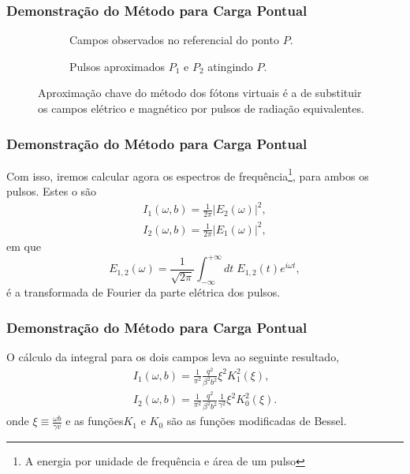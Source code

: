 \documentclass[xcolor=dvipsnames]{beamer}
\begin{document}
\begin{frame}
	\frametitle{Demonstração do Método para Carga Pontual}
	\begin{figure}
		\begin{subfigure}[b]{0.4\textwidth}
			\centering
			
			\caption{Campos observados no referencial do ponto $P$.}
		\end{subfigure}
		\hspace{1cm}
		\begin{subfigure}[b]{0.4\textwidth}
			\centering
			
			\caption{Pulsos aproximados $P_1$ e $P_2$ atingindo $P$.}
		\end{subfigure}
		\caption{Aproximação chave do método dos fótons virtuais é a de
		substituir os campos elétrico e magnético por pulsos de radiação
		equivalentes.}
	\end{figure}
\end{frame}

\begin{frame}
	\frametitle{Demonstração do Método para Carga Pontual}
	Com isso, iremos calcular agora os espectros de frequência\footnote{A
	energia por unidade de frequência e área de um pulso}, para ambos os
	pulsos. Estes o são
	\begin{gather}
		I_1(\omega , b) = \frac{1}{2\pi} |E_2 (\omega) |^2 ,\\
		I_2 (\omega , b) = \frac{1}{2\pi} |E_1 (\omega)|^2,
	\end{gather}
	em que 
	\begin{equation}
		E_{1,2} (\omega) = \frac{1}{\sqrt{2\pi}} \int _{-\infty}^{+\infty}
		dt \; E _{1,2} (t) e^{i\omega t},
	\end{equation}
	é a transformada de Fourier da parte elétrica dos pulsos.
\end{frame}

\begin{frame}
	\frametitle{Demonstração do Método para Carga Pontual}
	O cálculo da integral para os dois campos leva ao seguinte resultado,
	\begin{gather}
		I_1 (\omega , b) = \frac{1}{\pi ^2} \frac{q^2}{ \beta ^2 b^2}  
		\xi ^2 K_1 ^2 \left( \xi \right), \\
		I_2 (\omega , b) = \frac{1}{\pi ^2} \frac{q^2}{\beta ^2 b^2 }
		\frac{1}{\gamma ^2} \xi^2 K_0 ^2 \left( \xi \right).
	\end{gather}
	onde $\displaystyle \xi \equiv \frac {\omega b}{\gamma v}$ e as
	funções$K_1$ e $K_0$ são as funções modificadas de Bessel.
\end{frame}
\end{document}
